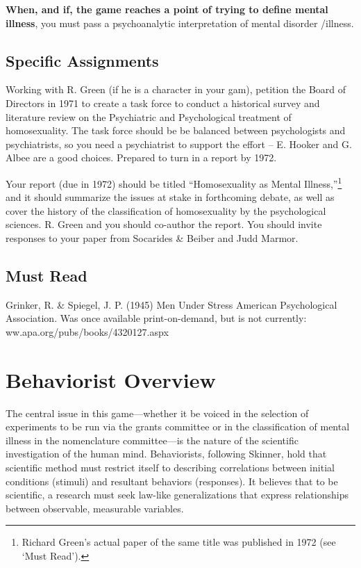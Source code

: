 \begin{refsection}
\textbf{When, and if, the game reaches a point of trying to define mental illness}, you must pass a psychoanalytic interpretation of mental disorder \slash  illness.

\section{Specific Assignments}
\label{specificassignments}

Working with R. Green (if he is a character in your gam), petition the Board of Directors in 1971 to create a task force to conduct a historical survey and literature review on the Psychiatric and Psychological treatment of homosexuality. The task force should be be balanced between psychologists and psychiatrists, so you need a psychiatrist to support the effort – E. Hooker and G. Albee are a good choices. Prepared to turn in a report by 1972.

Your report (due in 1972) should be titled ``Homosexuality as Mental Illness,''\footnote{Richard Green's actual paper of the same title was published in 1972 (see `Must Read').} and it should summarize the issues at stake in forthcoming debate, as well as cover the history of the classification of homosexuality by the psychological sciences. R. Green and you should co-author the report. You should invite responses to your paper from Socarides \& Beiber and Judd Marmor.

\section{Must Read}
\label{mustread}

Grinker, R. \& Spiegel, J. P. (1945) Men Under Stress American Psychological Association. Was once available print-on-demand, but is not currently: ww.apa.org\slash pubs\slash books\slash 4320127.aspx

\pagebreak 

\chapter{Behaviorist Overview}
\label{behavioristoverview}

The central issue in this game---whether it be voiced in the selection of experiments to be run via the grants committee or in the classification of mental illness in the nomenclature committee---is the nature of the scientific investigation of the human mind. Behaviorists, following Skinner, hold that scientific method must restrict itself to describing correlations between initial conditions (stimuli) and resultant behaviors (responses). It believes that to be scientific, a research must seek law-like generalizations that express relationships between observable, measurable variables.


\end{refsection}
